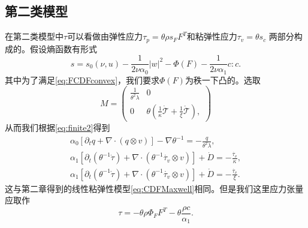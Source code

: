 \documentclass{article}
\begin{document}
\subsection{第二类模型}
在第二类模型中$\tau$可以看做由弹性应力$\tau_p = \theta \rho s_F F^T$和粘弹性应力$\tau_v=\theta s_c$
两部分构成的。假设熵函数有形式
\begin{equation*}
 	s = s_0(\nu,u) - \frac{1}{2 \nu \alpha_0} |w|^2 - \Phi (F)  - \frac{1}{2\nu \alpha_1}c:c .
\end{equation*}
其中为了满足\eqref{eq:FCDFconvex}，我们要求$\Phi(F)$为秩一下凸的。选取
\begin{equation*}
	M = \left( \begin{array}{ccc} 
			\frac{1}{\theta^2 \lambda} & 0 \\
			0 &  \theta(\frac{1}{\kappa} \dot{\mathcal{T}} + \frac{1}{\xi} \mathring{\mathcal{T}})  ,
		\end{array} \right)
\end{equation*}
从而我们根据\eqref{eq:finite2}得到
	\begin{subequations}
		\begin{align*}
			\alpha_0 [\partial_t q +  \nabla \cdot (q \otimes v)] - \nabla \theta^{-1} = -\frac{q}{\theta^2 \lambda}, \\
			\alpha_1[\partial_t (\theta^{-1} \dot{\tau}) + \nabla \cdot (\theta^{-1} \dot{\tau_v} \otimes v)] + \dot{D} = -\frac{\dot{\tau_v}}{\kappa}, \\
			\alpha_1[\partial_t (\theta^{-1} \mathring{\tau}) + \nabla \cdot (\theta^{-1} \mathring{\tau_v} \otimes v)] + \mathring{D} = -\frac{\dot{\tau_v}}{\xi}. 
		\end{align*}
	\end{subequations}
这与第二章得到的线性粘弹性模型\eqref{eq:CDFMaxwell}相同。但是我们这里应力张量应取作
\begin{equation*}
	\tau = -\theta \rho \Phi_F F^T - \theta \frac{\rho c}{\alpha_1}.
\end{equation*}
\end{document}
